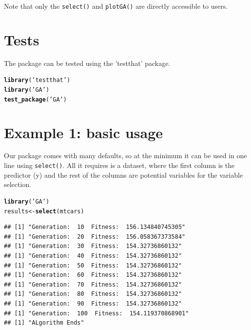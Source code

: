 \documentclass{article}\usepackage[]{graphicx}\usepackage[]{color}
\makeatletter
\newcommand{\hlstr}[1]{\textcolor[rgb]{0.192,0.494,0.8}{#1}}%
\newcommand{\hlstd}[1]{\textcolor[rgb]{0.345,0.345,0.345}{#1}}%
\newcommand{\hlkwb}[1]{\textcolor[rgb]{0.69,0.353,0.396}{#1}}%
\newcommand{\hlkwd}[1]{\textcolor[rgb]{0.737,0.353,0.396}{\textbf{#1}}}%
\newenvironment{kframe}{%
 \def\at@end@of@kframe{}%
 \ifinner\ifhmode%
  \def\at@end@of@kframe{\end{minipage}}%
  \begin{minipage}{\columnwidth}%
 \fi\fi%
 \def\FrameCommand##1{\hskip\@totalleftmargin \hskip-\fboxsep
 \colorbox{shadecolor}{##1}\hskip-\fboxsep
     \hskip-\linewidth \hskip-\@totalleftmargin \hskip\columnwidth}%
 \MakeFramed {\advance\hsize-\width
   \@totalleftmargin\z@ \linewidth\hsize
   \@setminipage}}%
 {\par\unskip\endMakeFramed%
 \at@end@of@kframe}
\newenvironment{knitrout}{}{} %
\makeatother
\begin{document}
Note that only the \texttt{select()} and \texttt{plotGA()} are directly accessible to users.

\section*{Tests}

The package can be tested using the 'testthat' package.
\begin{knitrout}
\color{fgcolor}\begin{kframe}
\begin{alltt}
\hlkwd{library}\hlstd{(}\hlstr{'testthat'}\hlstd{)}
\hlkwd{library}\hlstd{(}\hlstr{'GA'}\hlstd{)}
\hlkwd{test_package}\hlstd{(}\hlstr{'GA'}\hlstd{)}
\end{alltt}
\end{kframe}
\end{knitrout}

\section*{Example 1: basic usage}

Our package comes with many defaults, so at the minimum it can be used in one line using \texttt{select()}. All it requires is a dataset, where the first column is the predictor (y) and the rest of the columns are potential variables for the variable selection.

\begin{knitrout}
\color{fgcolor}\begin{kframe}
\begin{alltt}
\hlkwd{library}\hlstd{(}\hlstr{'GA'}\hlstd{)}
\hlstd{results}\hlkwb{<-}\hlkwd{select}\hlstd{(mtcars)}
\end{alltt}
\begin{verbatim}
## [1] "Generation:  10  Fitness:  156.134840745305"
## [1] "Generation:  20  Fitness:  156.058367373584"
## [1] "Generation:  30  Fitness:  154.32736860132"
## [1] "Generation:  40  Fitness:  154.32736860132"
## [1] "Generation:  50  Fitness:  154.32736860132"
## [1] "Generation:  60  Fitness:  154.32736860132"
## [1] "Generation:  70  Fitness:  154.32736860132"
## [1] "Generation:  80  Fitness:  154.32736860132"
## [1] "Generation:  90  Fitness:  154.32736860132"
## [1] "Generation:  100  Fitness:  154.119370868901"
## [1] "ALgorithm Ends"
\end{verbatim}
\end{kframe}
\end{knitrout}
\end{document}
